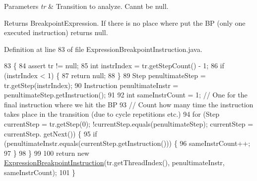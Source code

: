 \begin{DoxyParams}{Parameters}
{\em tr} & Transition to analyze. Cann\textquotesingle{}t be null. \\
\hline
\end{DoxyParams}
\begin{DoxyReturn}{Returns}
Breakpoint\+Expression. If there is no place where put the BP (only one executed instruction) returns null. 
\end{DoxyReturn}


Definition at line 83 of file Expression\+Breakpoint\+Instruction.\+java.


\begin{DoxyCode}
83                                                                                     \{
84     assert tr != null;
85     \textcolor{keywordtype}{int} instrIndex = tr.getStepCount() - 1;
86     \textcolor{keywordflow}{if} (instrIndex < 1) \{
87       \textcolor{keywordflow}{return} null;
88     \}
89     Step penultimateStep = tr.getStep(instrIndex);
90     Instruction penultimateInstr = penultimateStep.getInstruction();
91 
92     \textcolor{keywordtype}{int} sameInstrCount = 1; \textcolor{comment}{// One for the final instruction where we hit the BP}
93     \textcolor{comment}{// Count how many time the instruction takes place in the transition (due to cycle repetitions etc.)}
94     \textcolor{keywordflow}{for} (Step currentStep = tr.getStep(0); !currentStep.equals(penultimateStep); currentStep = currentStep.
      getNext()) \{
95       \textcolor{keywordflow}{if} (penultimateInstr.equals(currentStep.getInstruction())) \{
96         sameInstrCount++;
97       \}
98     \}
99 
100     \textcolor{keywordflow}{return} \textcolor{keyword}{new} \hyperlink{classgov_1_1nasa_1_1jpf_1_1inspector_1_1server_1_1expression_1_1expressions_1_1_expression_breakpoint_instruction_af3bbbaf6362cc127d219c4e44ede7ce4}{ExpressionBreakpointInstruction}(tr.getThreadIndex(), 
      penultimateInstr, sameInstrCount);
101   \}
\end{DoxyCode}
